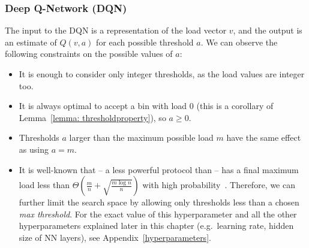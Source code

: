 \subsubsection{Deep Q-Network (DQN)} \label{DQN}

The input to the DQN is a representation of the load vector $v$, and the output is an estimate of $Q(v, a)$ for each possible threshold $a$. We can observe the following constraints on the possible values of $a$:

\begin{itemize}
    \item It is enough to consider only integer thresholds, as the load values are integer too.
    \item It is always optimal to accept a bin with load $0$ (this is a corollary of Lemma~\ref{lemma: thresholdproperty}), so $a\geq 0$.
    \item Thresholds $a$ larger than the maximum possible load $m$ have the same effect as using $a=m$.
    \item It is well-known that \OneChoice -- a less powerful protocol than \TwoThinning -- has a final maximum load less than $\Theta (\frac{m}{n} + \sqrt{\frac{m\log n}{n}})$ with high probability~\cite{raab1998onechoice}. Therefore, we can further limit the search space by allowing only thresholds less than a chosen \textit{max threshold}. For the exact value of this hyperparameter and all the other hyperparameters explained later in this chapter (e.g.\ learning rate, hidden size of NN layers), see Appendix~\ref{hyperparameters}.  
    
\end{itemize}


